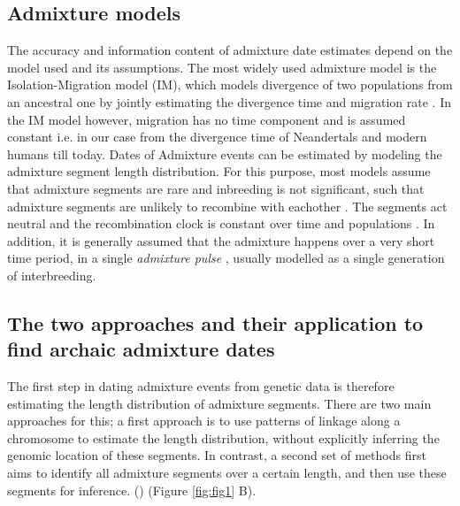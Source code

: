 \documentclass[]{article}
\begin{document}
\subsection{Admixture models}\label{Admixture models}

The accuracy and information content of admixture date estimates depend on the model used and its assumptions. The most widely used admixture model is the Isolation-Migration model (IM), which models divergence of two populations from an ancestral one by jointly estimating the divergence time and migration rate \citep{nielsen_distinguishing_2001,hey_multilocus_2004}. In the IM model however, migration has no time component and is assumed constant i.e. in our case from the divergence time of Neandertals and modern humans till today. Dates of Admixture events can be estimated by modeling the admixture segment length distribution. For this purpose, most models assume that admixture segments are rare and inbreeding is not significant, such that admixture segments are unlikely to recombine with eachother \citep{pool_inference_2009,liang_lengths_2014}. The segments act neutral \citep{shchur_distribution_2019} and the recombination clock is constant over time and populations \citep{gravel_population_2012}. In addition, it is generally assumed that the admixture happens over a very short time period, in a single \textit{admixture pulse} \citep{moorjani_history_2011}, usually modelled as a single generation of interbreeding.


\subsection{The two approaches and their application to find archaic admixture dates}\label{the-two-approaches-and-their-application-to-find-archaic-admixture-dates}

The first step in dating admixture events from genetic data is therefore estimating the length distribution of admixture segments.  There are two main approaches for this; a first approach is to use patterns of linkage along a chromosome to estimate the length distribution, without explicitly inferring the genomic location of these segments. In contrast, a second set of methods first aims to identify all admixture segments over a certain length, and then use these segments for inference. 
(\citep{chimusa_dating_2018}) (Figure \ref{fig:fig1} B).
\end{document}

